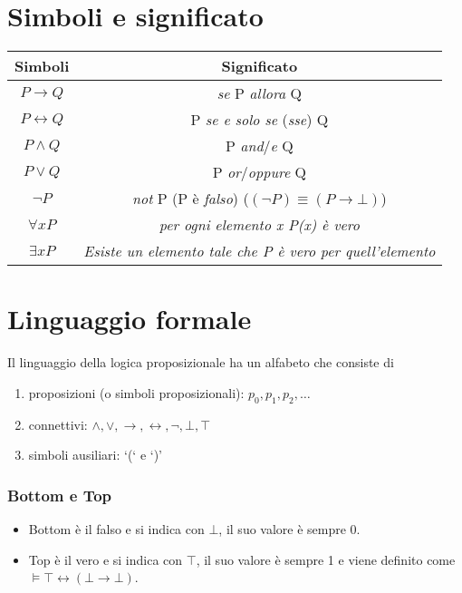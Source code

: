 \documentclass[a4paper,12pt]{report}
\begin{document}
\section{Simboli e significato}
\begin{tabular}{| c | c |}
\hline
\textbf{Simboli} & \textbf{Significato} \\ 
\hline
$P \to Q$ & \emph{se} P \emph{allora} Q \\
\hline
$P \leftrightarrow Q$ & P \emph{se e solo se} (\emph{sse}) Q \\
\hline
$P \wedge Q$ & P \emph{and}/\emph{e} Q \\
\hline
$P \lor Q$ & P \emph{or}/\emph{oppure} Q \\
\hline
$\neg P$ & \emph{not} P (P \`{e} \emph{falso}) ($(\neg P) \equiv (P \to \bot)$) \\
\hline
$\forall x P$ & \emph{per ogni elemento x P(x) \`{e} vero} \\
\hline
$\exists x P$ & \emph{Esiste un elemento tale che P \`{e} vero per quell'elemento} \\
\hline
\end{tabular}

\section{Linguaggio formale}
Il linguaggio della logica proposizionale ha un alfabeto che consiste di 
\begin{enumerate} 
\item proposizioni (o simboli proposizionali): $p_0, p_1, p_2, \dots$
\item connettivi: $\wedge, \lor, \to, \leftrightarrow, \neg, \bot, \top$
\item simboli ausiliari: `(` e `)'
\end{enumerate}

\subsubsection{Bottom e Top}
\begin{itemize}
\item Bottom \`{e} il falso e si indica con $\bot$, il suo valore \`{e} sempre 0.
\item Top \`{e} il vero e si indica con $\top$, il suo valore \`{e} sempre 1 e viene definito come $\vDash \top \leftrightarrow (\bot \to \bot)$.
\end{itemize}
\end{document}
